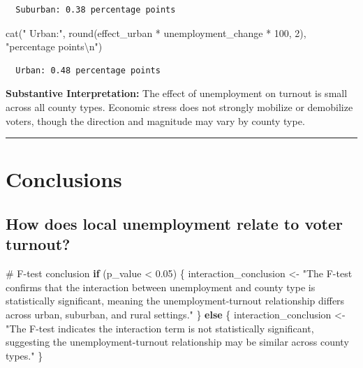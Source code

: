 \documentclass[
  11pt,
]{article}
\newenvironment{Shaded}{\begin{snugshade}}{\end{snugshade}}
\newcommand{\CommentTok}[1]{\textcolor[rgb]{0.37,0.37,0.37}{#1}}
\newcommand{\ControlFlowTok}[1]{\textcolor[rgb]{0.00,0.23,0.31}{\textbf{#1}}}
\newcommand{\DecValTok}[1]{\textcolor[rgb]{0.68,0.00,0.00}{#1}}
\newcommand{\FloatTok}[1]{\textcolor[rgb]{0.68,0.00,0.00}{#1}}
\newcommand{\FunctionTok}[1]{\textcolor[rgb]{0.28,0.35,0.67}{#1}}
\newcommand{\NormalTok}[1]{\textcolor[rgb]{0.00,0.23,0.31}{#1}}
\newcommand{\OtherTok}[1]{\textcolor[rgb]{0.00,0.23,0.31}{#1}}
\newcommand{\SpecialCharTok}[1]{\textcolor[rgb]{0.37,0.37,0.37}{#1}}
\newcommand{\StringTok}[1]{\textcolor[rgb]{0.13,0.47,0.30}{#1}}
\begin{document}
\begin{verbatim}
  Suburban: 0.38 percentage points
\end{verbatim}

\begin{Shaded}
\begin{Highlighting}[]
\FunctionTok{cat}\NormalTok{(}\StringTok{"  Urban:"}\NormalTok{, }\FunctionTok{round}\NormalTok{(effect\_urban }\SpecialCharTok{*}\NormalTok{ unemployment\_change }\SpecialCharTok{*} \DecValTok{100}\NormalTok{, }\DecValTok{2}\NormalTok{), }\StringTok{"percentage points}\SpecialCharTok{\textbackslash{}n}\StringTok{"}\NormalTok{)}
\end{Highlighting}
\end{Shaded}

\begin{verbatim}
  Urban: 0.48 percentage points
\end{verbatim}

\textbf{Substantive Interpretation:} The effect of unemployment on
turnout is small across all county types. Economic stress does not
strongly mobilize or demobilize voters, though the direction and
magnitude may vary by county type.

\begin{center}\rule{0.5\linewidth}{0.5pt}\end{center}

\section{Conclusions}\label{conclusions}

\subsection{How does local unemployment relate to voter
turnout?}\label{how-does-local-unemployment-relate-to-voter-turnout}

\begin{Shaded}
\begin{Highlighting}[]
\CommentTok{\# F{-}test conclusion}
\ControlFlowTok{if}\NormalTok{ (p\_value }\SpecialCharTok{\textless{}} \FloatTok{0.05}\NormalTok{) \{}
\NormalTok{  interaction\_conclusion }\OtherTok{\textless{}{-}} \StringTok{"The F{-}test confirms that the interaction between unemployment and county type is statistically significant, meaning the unemployment{-}turnout relationship differs across urban, suburban, and rural settings."}
\NormalTok{\} }\ControlFlowTok{else}\NormalTok{ \{}
\NormalTok{  interaction\_conclusion }\OtherTok{\textless{}{-}} \StringTok{"The F{-}test indicates the interaction term is not statistically significant, suggesting the unemployment{-}turnout relationship may be similar across county types."}
\NormalTok{\}}
\end{Highlighting}
\end{Shaded}
\end{document}
